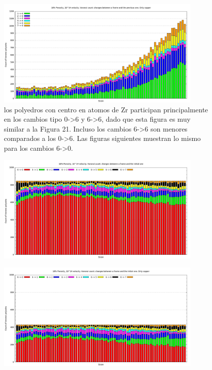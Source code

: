 \documentclass[10pt, oneside]{article} %
\begin{document}
\begin{figure}[H]
\centering
\includegraphics[width=10cm]{Figures/Porosidad_2vel_comp_voronoi_hist13.png}
\caption{los polyedros con centro en atomos de Zr participan principalmente en los cambios tipo 0->6 y 6->6, dado que esta figura es muy similar a la Figura 21. Incluso los cambios 6->6 son menores comparados a los 0->6. Las figuras siguientes muestran lo mismo para los cambios 6->0.}
\end{figure}

\begin{figure}[H]
\centering
\includegraphics[width=10cm]{Figures/Porosidad_2vel_comp_voronoi_hist14.png}
\caption{}
\end{figure}

\begin{figure}[H]
\centering
\includegraphics[width=10cm]{Figures/Porosidad_2vel_comp_voronoi_hist15.png}
\caption{}
\end{figure}
\end{document}
